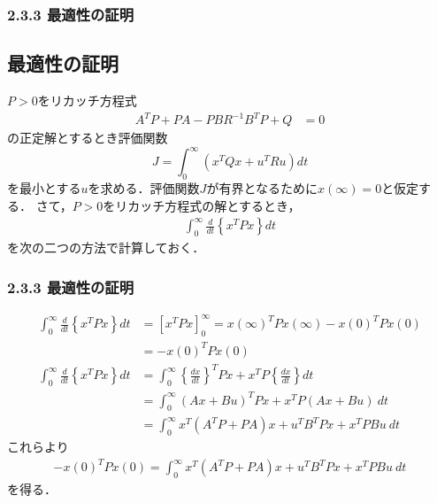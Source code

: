 \begin{frame}[t]
\frametitle{2.3.3 最適性の証明}
\subsection{最適性の証明}

$P>0$をリカッチ方程式
\begin{align}
	A^T P + P A - P B R^{-1} B^T P + Q &= 0
\end{align}
の正定解とするとき評価関数
\begin{equation}
 J = \int_{0}^{\infty} (x^T Q x + u^T R u) dt
\end{equation}
を最小とする$u$を求める．評価関数$J$が有界となるために$x(\infty) = 0$と仮定する．
さて，$P>0$をリカッチ方程式の解とするとき，
\begin{align}
	\int_0^\infty \frac{d}{dt}\left\{x^T P x \right\}  dt
\end{align}
を次の二つの方法で計算しておく．
\end{frame}

\begin{frame}[t]
\frametitle{2.3.3 最適性の証明}

\begin{align}
	\int_0^\infty \frac{d}{dt}\left\{x^T P x \right\}  dt 
		&= \left[ x^T P x \right]_0^\infty 
		= x(\infty)^T P x(\infty) - x(0)^T P x(0)
\nonumber \\
		&= - x(0)^T P x(0)
\\
	\int_0^\infty \frac{d}{dt}\left\{x^T P x \right\}  dt 
		&= \int_0^\infty \left\{ \frac{dx}{dt} \right\}^T P x + x^T P\left\{ \frac{dx}{dt} \right\} dt 
\nonumber \\
		&= \int_0^\infty (Ax + Bu)^T P x + x^T P (Ax + Bu) \ dt
\nonumber\\
		&= \int_0^\infty x^T (A^T P + PA) x + u^T B^T P x + x^T P B u \ dt
\end{align}
これらより
\begin{align}
	- x(0)^T P x(0) = \int_0^\infty x^T (A^T P + PA) x + u^T B^T P x + x^T P B u \ dt
\end{align}
を得る．
\end{frame}

